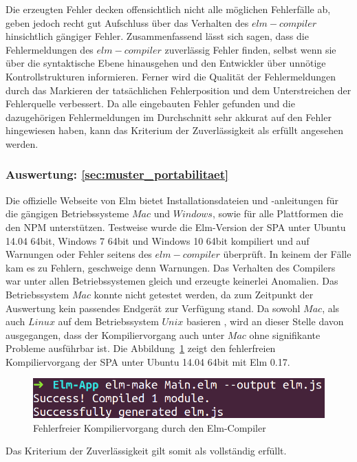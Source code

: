 Die erzeugten Fehler decken offensichtlich nicht alle möglichen Fehlerfälle ab, geben jedoch recht gut Aufschluss über das Verhalten des $elm-compiler$ hinsichtlich gängiger Fehler. Zusammenfassend lässt sich sagen, dass die Fehlermeldungen des $elm-compiler$ zuverlässig Fehler finden, selbst wenn sie über die syntaktische Ebene hinausgehen und den Entwickler über unnötige Kontrollstrukturen informieren. Ferner wird die Qualität der Fehlermeldungen durch das Markieren der tatsächlichen Fehlerposition und dem Unterstreichen der Fehlerquelle verbessert.
Da alle eingebauten Fehler gefunden und die dazugehörigen Fehlermeldungen im Durchschnitt sehr akkurat auf den Fehler hingewiesen haben, kann das Kriterium der Zuverlässigkeit als erfüllt angesehen werden.


\subsubsection{Auswertung: \ref{sec:muster_portabilitaet} }
Die offizielle Webseite von Elm bietet Installationsdateien und -anleitungen für die gängigen Betriebssysteme $Mac$ und $Windows$, sowie für alle Plattformen die den \ac{NPM} unterstützen. Testweise wurde die Elm-Version der \ac{SPA} unter Ubuntu 14.04 64bit, Windows 7 64bit und Windows 10 64bit kompiliert und auf Warnungen oder Fehler seitens des $elm-compiler$ überprüft. In keinem der Fälle kam es zu Fehlern, geschweige denn Warnungen. Das Verhalten des Compilers war unter allen Betriebssystemen gleich und erzeugte keinerlei Anomalien. Das Betriebssystem $Mac$ konnte nicht getestet werden, da zum Zeitpunkt der Auswertung kein passendes Endgerät zur Verfügung stand. Da sowohl $Mac$, als auch $Linux$ auf dem Betriebssystem $Unix$ basieren \cite{http://www.itwissen.info/definition/lexikon/UNIX.html}, wird an dieser Stelle davon ausgegangen, dass der Kompiliervorgang auch unter $Mac$ ohne signifikante Probleme ausführbar ist. Die Abbildung~\ref{fig:elm-compile} zeigt den fehlerfreien Kompiliervorgang der \ac{SPA} unter Ubuntu 14.04 64bit mit Elm 0.17.
\begin{figure}[h]
\centering
\includegraphics[scale=0.5]{img/elm-compile.png}
\caption{Fehlerfreier Kompiliervorgang durch den Elm-Compiler}\label{fig:elm-compile}
\end{figure}
Das Kriterium der Zuverlässigkeit gilt somit als vollständig erfüllt.


